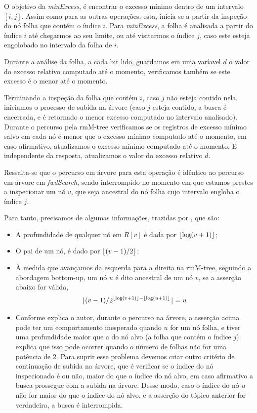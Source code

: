     
    O objetivo da \textit{minExcess}, é encontrar o excesso mínimo dentro de um intervalo $[i, j]$. Assim como para as outras operações, esta, inicia-se a partir da inspeção do nó folha que contém o índice $i$. Para \textit{minExcess}, a folha é analisada a partir do índice $i$ até chegarmos ao seu limite, ou até visitarmos o índice $j$, caso este esteja engolobado no intervalo da folha de $i$. 

    Durante a análise da folha, a cada bit lido, guardamos em uma varíavel $d$ o valor do excesso relativo computado até o momento, verificamos também se este excesso é o menor até o momento.

    Terminando a inspeção da folha que contém $i$, caso $j$ não esteja contido nela, iniciamos o processo de subida na árvore (caso $j$ esteja contido, a busca é encerrada, e é retornado o menor excesso computado no intervalo analisado). Durante o percurso pela rmM-tree verificamos se os registros de excesso mínimo salvo em cada nó é menor que o excesso mínimo computado até o momento, em caso afirmativo, atualizamos o excesso mínimo computado até o momento. E independente da resposta, atualizamos o valor do excesso relativo $d$.

    Ressalta-se que o percurso em árvore para esta operação é idêntico ao percurso em árvore em \textit{fwdSearch}, sendo interrompido no momento em que estamos prestes a inspecionar um nó $v$, que seja ancestral do nó folha cujo intervalo engloba o índice $j$.

    Para tanto, precisamos de algumas informações, trazidas por \citet{book-compact-data-structures}, que são:
    \begin{itemize}
        \item A profundidade de qualquer nó em $R[v]$ é dada por $\lfloor\log (v + 1 )\rfloor$;
        \item O pai de um nó, é dado por $\lfloor(v-1)/2\rfloor$;
        \item À medida que avançamos da esquerda para a direita na rmM-tree, seguindo a abordagem bottom-up, um nó $u$ é dito ancestral de um nó $v$, se a asserção abaixo for válida,
        $$\lfloor(v-1)/2^{\lfloor\log (v+1)\rfloor - \lfloor\log (u+1)\rfloor}\rfloor = u$$
        \item Conforme explica o autor, durante o percurso na árvore, a asserção acima pode ter um comportamento inesperado quando  $u$ for um nó folha, e tiver uma profundidade maior que a do nó alvo (a folha que contém o índice $j$). \citet{book-compact-data-structures} explica que isso pode ocorrer quando o número de folhas não for uma potência de $2$. 
        Para suprir esse problema devemos criar outro critério de continuação de subida na árvore, que é verificar se o índice do nó inspecionado é ou não, maior do que o índice do nó alvo, em caso afirmativo a busca prossegue com a subida na árvore. Desse modo, caso o índice do nó $u$ não for maior do que o índice do nó alvo, e a asserção do tópico anterior for verdadeira, a busca é interrompida.
    \end{itemize}



